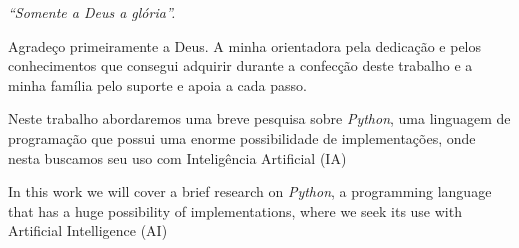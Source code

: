 \begin{flushright}
{\it ``Somente a Deus a glória''.}
\end{flushright}


\pagebreak



\vspace{1.5cm}

Agradeço primeiramente a Deus. A minha orientadora pela dedicação e pelos conhecimentos que consegui adquirir durante a confecção deste trabalho e a minha família pelo suporte e apoia a cada passo.

\vspace{0.5cm}

\newpage


\vspace{1.5cm}

Neste trabalho abordaremos uma breve pesquisa sobre \textit{Python}, uma linguagem de programação que possui uma enorme possibilidade de implementações, onde nesta buscamos seu uso com Inteligência Artificial (IA)

\vspace{0.5cm}


\pagebreak

\thispagestyle{empty}


\vspace{1.5cm}

In this work we will cover a brief research on \textit{Python}, a programming language that has a huge possibility of implementations, where we seek its use with Artificial Intelligence (AI)

\vspace{0.5cm}


